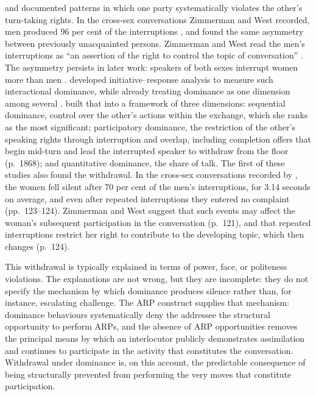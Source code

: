 \citet{ZimmermanWest1975} and \citet{WestZimmerman1983} documented patterns in which one party systematically violates the other's turn-taking rights. In the cross-sex conversations Zimmerman and West recorded, men produced 96 per cent of the interruptions \citep[p.~116]{ZimmermanWest1975}, and \citet{WestZimmerman1983} found the same asymmetry between previously unacquainted persons. Zimmerman and West read the men's interruptions as ``an assertion of the right to control the topic of conversation'' \citep[p.~124]{ZimmermanWest1975}. The asymmetry persists in later work: speakers of both sexes interrupt women more than men \citep{HancockRubin2015}. \citet{Linell1988} developed initiative--response analysis to measure such interactional dominance, while already treating dominance as one dimension among several \citep[p.~1861]{Itakura2001}. \citet{Itakura2001} built that into a framework of three dimensions: sequential dominance, control over the other's actions within the exchange, which she ranks as the most significant; participatory dominance, the restriction of the other's speaking rights through interruption and overlap, including completion offers that begin mid-turn and lead the interrupted speaker to withdraw from the floor (p.~1868); and quantitative dominance, the share of talk. The first of these studies also found the withdrawal. In the cross-sex conversations recorded by \citet{ZimmermanWest1975}, the women fell silent after 70 per cent of the men's interruptions, for 3.14 seconds on average, and even after repeated interruptions they entered no complaint (pp.~123--124). Zimmerman and West suggest that such events may affect the woman's subsequent participation in the conversation (p.~121), and that repeated interruptions restrict her right to contribute to the developing topic, which then changes (p.~124).

This withdrawal is typically explained in terms of power, face, or politeness violations. The explanations are not wrong, but they are incomplete: they do not specify the mechanism by which dominance produces silence rather than, for instance, escalating challenge. The ARP construct supplies that mechanism: dominance behaviours systematically deny the addressee the structural opportunity to perform ARPs, and the absence of ARP opportunities removes the principal means by which an interlocutor publicly demonstrates assimilation and continues to participate in the activity that constitutes the conversation. Withdrawal under dominance is, on this account, the predictable consequence of being structurally prevented from performing the very moves that constitute participation.

